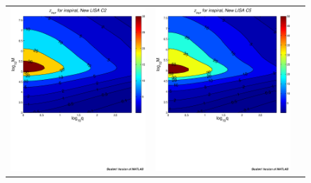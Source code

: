 \documentclass{iopart}
\begin{document}
%
\begin{figure}[htb]
\begin{center}
\begin{tabular}{ccc}
\includegraphics[scale=0.33,clip=true]{FigEmanuele/C2InspZhorContour.ps}
&\includegraphics[scale=0.33,clip=true]{FigEmanuele/C5InspZhorContour.ps}

\end{tabular}
\end{center}
\end{figure}
\end{document}
